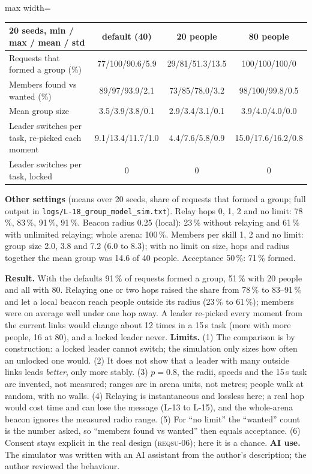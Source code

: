 \IfFileExists{IEEEtran.cls}{\documentclass[conference]{IEEEtran}}{\documentclass[10pt,twocolumn]{article}}
\newcommand{\req}[1]{\textsc{reqsu-}#1}
\newcommand{\fitcol}[1]{\begin{adjustbox}{max width=\columnwidth}#1\end{adjustbox}}
\begin{document}
\begin{center}\footnotesize\setlength{\tabcolsep}{3pt}
\fitcol{\begin{tabular}{@{}l ccc@{}}
\toprule
20 seeds, min / max / mean / std & default (40) & 20 people & 80 people\\
\midrule
Requests that formed a group (\%) & 77/100/90.6/5.9 & 29/81/51.3/13.5 & 100/100/100/0\\
Members found vs wanted (\%) & 89/97/93.9/2.1 & 73/85/78.0/3.2 & 98/100/99.8/0.5\\
Mean group size & 3.5/3.9/3.8/0.1 & 2.9/3.4/3.1/0.1 & 3.9/4.0/4.0/0.0\\
Leader switches per task, re-picked each moment & 9.1/13.4/11.7/1.0 & 4.4/7.6/5.8/0.9 & 15.0/17.6/16.2/0.8\\
Leader switches per task, locked & 0 & 0 & 0\\
\bottomrule
\end{tabular}}
\end{center}
\textbf{Other settings} (means over 20 seeds, share of requests that formed a group; full output in \texttt{logs/L-18\_group\_model\_sim.txt}). Relay hops 0, 1, 2 and no limit: 78\,\%, 83\,\%, 91\,\%, 91\,\%. Beacon radius 0.25 (local): 23\,\% without relaying and 61\,\% with unlimited relaying; whole arena: 100\,\%. Members per skill 1, 2 and no limit: group size 2.0, 3.8 and 7.2 (6.0 to 8.3); with no limit on size, hops and radius together the mean group was 14.6 of 40 people. Acceptance 50\,\%: 71\,\% formed.

\textbf{Result.} With the defaults 91\,\% of requests formed a group, 51\,\% with 20 people and all with 80. Relaying one or two hops raised the share from 78\,\% to 83--91\,\% and let a local beacon reach people outside its radius (23\,\% to 61\,\%); members were on average well under one hop away. A leader re-picked every moment from the current links would change about 12 times in a 15\,s task (more with more people, 16 at 80), and a locked leader never. \textbf{Limits.} (1) The comparison is by construction: a locked leader cannot switch; the simulation only sizes how often an unlocked one would. (2) It does not show that a leader with many outside links leads \emph{better}, only more stably. (3) $p=0.8$, the radii, speeds and the 15\,s task are invented, not measured; ranges are in arena units, not metres; people walk at random, with no walls. (4) Relaying is instantaneous and lossless here; a real hop would cost time and can lose the message (L-13 to L-15), and the whole-arena beacon ignores the measured radio range. (5) For ``no limit'' the ``wanted'' count is the number asked, so ``members found vs wanted'' then equals acceptance. (6) Consent stays explicit in the real design (\req{06}); here it is a chance. \textbf{AI use.} The simulator was written with an AI assistant from the author's description; the author reviewed the behaviour.
\end{document}
